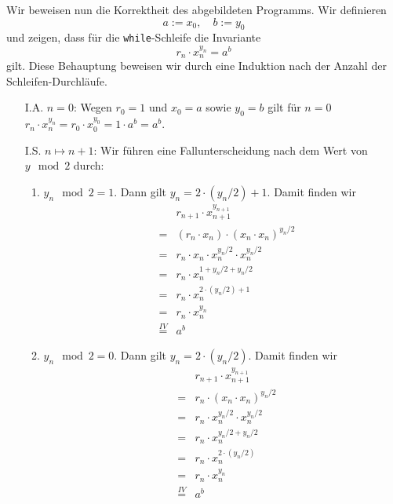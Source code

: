 Wir beweisen nun die Korrektheit des abgebildeten Programms.  Wir definieren
\[ a := x_0, \quad b := y_0 \]
und zeigen, dass f\"ur die \texttt{while}-Schleife die Invariante
\begin{equation}
  \label{eq:powerInv}
   r_n \cdot x_n^{y_n} = a^b   
\end{equation}
gilt.  Diese Behauptung beweisen wir durch eine Induktion nach der Anzahl der
Schleifen-Durchl\"aufe.
\begin{enumerate}
\item[I.A.] $n=0$:  Wegen $r_0 = 1$ und $x_0 = a$ sowie $y_0 = b$ gilt f\"ur $n= 0$ 
            \\[0.2cm]
            \hspace*{1.3cm}
            $r_n \cdot x_n^{y_n} = r_0 \cdot x_0^{y_0} = 1 \cdot a^{b} = a^b$.
\item[I.S.] $n \mapsto n + 1$:  Wir f\"uhren eine Fallunterscheidung nach dem Wert von $y \mod 2$ durch:
            \begin{enumerate}
            \item $y_n \mod 2 = 1$.  Dann gilt $y_{n} = 2 \cdot (y_n/2) + 1$.
                  Damit finden wir
                  \begin{eqnarray*}
                      &   & r_{n+1} \cdot x_{n+1}^{y_{n+1}} \\[0.2cm] 
                      & = & (r_{n} \cdot x_n) \cdot (x_{n} \cdot x_{n})^{y_{n}/2} \\[0.2cm] 
                      & = & r_{n} \cdot x_n \cdot x_{n}^{y_{n}/2} \cdot x_{n}^{y_{n}/2} \\[0.2cm] 
                      & = & r_{n} \cdot x_n^{1 + y_{n}/2 + y_{n}/2} \\[0.2cm] 
                      & = & r_{n} \cdot x_n^{2 \cdot (y_{n}/2) + 1} \\[0.2cm] 
                      & = & r_{n} \cdot x_n^{y_n} \\
                      & \stackrel{IV}{=} & a^{b} 
                  \end{eqnarray*}
            \item $y_n \mod 2 = 0$.  Dann gilt $y_{n} = 2 \cdot (y_n/2)$.
                  Damit finden wir
                  \begin{eqnarray*}
                      &   & r_{n+1} \cdot x_{n+1}^{y_{n+1}} \\[0.2cm] 
                      & = & r_{n} \cdot (x_{n} \cdot x_{n})^{y_{n}/2} \\[0.2cm] 
                      & = & r_{n} \cdot x_{n}^{y_{n}/2} \cdot x_{n}^{y_{n}/2} \\[0.2cm] 
                      & = & r_{n} \cdot x_n^{y_{n}/2 + y_{n}/2} \\[0.2cm] 
                      & = & r_{n} \cdot x_n^{2 \cdot (y_{n} / 2)} \\[0.2cm] 
                      & = & r_{n} \cdot x_n^{y_n} \\
                      & \stackrel{IV}{=} & a^{b} 
                  \end{eqnarray*}
            \end{enumerate}
\end{enumerate}
